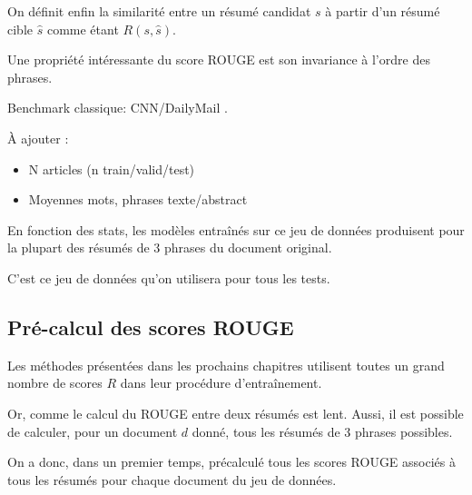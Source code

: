 On définit enfin la similarité entre un résumé candidat $s$ à partir d'un résumé cible $\hat{s}$
comme étant $R(s, \hat{s})$.

Une propriété intéressante du score ROUGE est son invariance à
l'ordre des phrases.


Benchmark classique: CNN/DailyMail \citep{DBLP:journals/corr/SeeLM17}.

À ajouter :

\begin{itemize}
    \item N articles (n train/valid/test)
    \item Moyennes mots, phrases texte/abstract
\end{itemize}

En fonction des stats, les modèles entraînés sur ce jeu de données produisent
pour la plupart des résumés de 3 phrases du document original.

C'est ce jeu de données qu'on utilisera pour tous les tests.

\subsection{Pré-calcul des scores ROUGE}

Les méthodes présentées dans les prochains chapitres utilisent toutes
un grand nombre de scores $R$ dans leur procédure d'entraînement.

Or, comme le calcul du ROUGE entre deux résumés est lent.
Aussi, il est possible de calculer, pour un document $d$ donné, tous les
résumés de 3 phrases possibles.

On a donc, dans un premier temps, précalculé tous les scores ROUGE
associés à tous les résumés pour chaque document du jeu de données.

